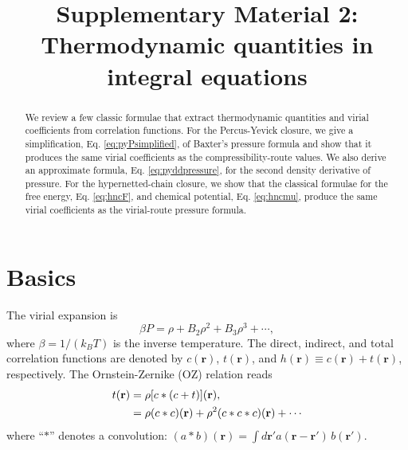 \documentclass[preprint]{revtex4-1}
\newcommand{\vct}[1]{\mathbf{#1}}
\providecommand{\vr}{} %
\renewcommand{\vr}{\vct{r}}
\begin{document}
\title{Supplementary Material 2: Thermodynamic quantities in integral equations}

\begin{abstract}
We review a few classic formulae that extract thermodynamic quantities
  and virial coefficients from correlation functions.
%
For the Percus-Yevick closure,
  we give a simplification, Eq. \eqref{eq:pyPsimplified},
  of Baxter's pressure formula
  and show that it produces the same virial coefficients
  as the compressibility-route values.
%
We also derive an approximate formula, Eq. \eqref{eq:pyddpressure},
  for the second density derivative of pressure.
%
For the hypernetted-chain closure,
  we show that the classical formulae
  for the free energy, Eq. \eqref{eq:hncF},
  and chemical potential, Eq. \eqref{eq:hncmu},
  produce the same virial coefficients
  as the virial-route pressure formula.
\end{abstract}

\maketitle






\section{Basics}

%
The virial expansion is
%
\begin{equation}
  \beta P = \rho + B_2 \rho^2 + B_3 \rho^3 + \cdots,
\label{eq:virial}
\end{equation}
%
where $\beta = 1/(k_B T)$ is the inverse temperature.
%
The direct, indirect, and total correlation functions
  are denoted by $c(\vr)$, $t(\vr)$,
  and $h(\vr) \equiv c(\vr) + t(\vr)$,
  respectively.
%
The Ornstein-Zernike (OZ) relation\cite{hansen} reads
%
\begin{align}
  t(\vr) &= \rho [c * (c + t)](\vr), \notag \\
         &= \rho (c*c)(\vr) + \rho^2 (c*c*c)(\vr) + \cdots
\label{eq:oz}
\end{align}
%
where ``$*$'' denotes a convolution:
  $(a * b)(\vr) = \int d\vr' a(\vr - \vr') \, b(\vr')$.
%
\end{document}
